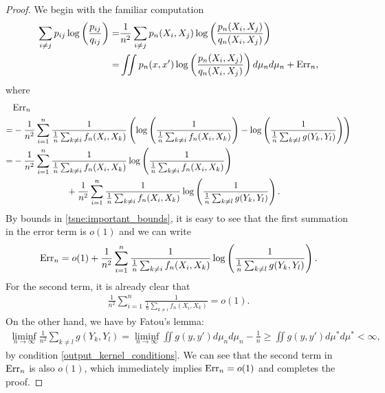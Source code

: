 \documentclass[10pt]{article}
\newenvironment{Proof of lemma}{\noindent{\bf Proof of Lemma}}{\hfill$\Box$\newline}
\newenvironment{Proof of claim}{\noindent{\bf Proof of claim}}{\hfill$\Box$\newline}
\newenvironment{Proof of theorem}{\noindent{\bf Proof of Theorem}}{\hfill\scriptsize{$\Box$}\newline}
\newenvironment{Proof of theorems}{\noindent{\bf Proof of Theorems}}{\hfill$\Box$\newline}
\newenvironment{Proof of proposition}{\noindent{\bf Proof of Proposition}}{\hfill$\Box$\newline}
\newenvironment{Proof of propositions}{\noindent{\bf Proof of Propositions}}{\hfill$\Box$\newline}
\newenvironment{Proof of exercise}{\noindent{\it Proof of Exercise:}}{\hfill$\Box$}
\numberwithin{equation}{section}
\begin{document}
\begin{proof}
    We begin with the familiar computation
    \begin{align}
        \sum_{i \neq j} p_{ij} \log \left(\frac{p_{ij}}{q_{ij}}\right) = & \frac{1}{n^2}\sum_{i \neq j}p_n(X_i,X_j) \log \left(\frac{p_n(X_i,X_j)}{q_n(X_i,X_j)}\right) \nonumber          \\
        =                                                                & \iint p_n(x,x') \log \left(\frac{p_n(X_i,X_j)}{q_n(X_i,X_j)}\right) d \mu_n d \mu_n + \text{\normalfont Err}_n,
    \end{align}
    where
    \begin{align}
          & \text{\normalfont Err}_n \nonumber                                                                                                                                                                                                   \\
        = & -\frac{1}{n^2}\sum_{i=1}^n\frac{1}{\frac{1}{n}\sum_{k \neq i}f_n(X_i,X_k)}\left(\log \left(\frac{1}{\frac{1}{n}\sum_{k \neq i}f_n(X_i,X_k)}\right)-\log \left(\frac{1}{\frac{1}{n}\sum_{k \neq l}g(Y_k,Y_l)}\right)\right) \nonumber \\
        = & -\frac{1}{n^2}\sum_{i=1}^n\frac{1}{\frac{1}{n}\sum_{k \neq i}f_n(X_i,X_k)}\log \left(\frac{1}{\frac{1}{n}\sum_{k \neq i}f_n(X_i,X_k)}\right) \nonumber                                                                               \\
          & \qquad \qquad \qquad + \frac{1}{n^2}\sum_{i=1}^n\frac{1}{\frac{1}{n}\sum_{k \neq i}f_n(X_i,X_k)}\log \left(\frac{1}{\frac{1}{n}\sum_{k \neq l}g(Y_k,Y_l)}\right).
    \end{align}
    By bounds in \eqref{tsne:important_bounds}, it is easy to see that the first summation in the error term is $o(1)$ and we can write
    \begin{align}
        \text{\normalfont Err}_n = o(1) + \frac{1}{n^2}\sum_{i=1}^n\frac{1}{\frac{1}{n}\sum_{k \neq i}f_n(X_i,X_k)}\log \left(\frac{1}{\frac{1}{n}\sum_{k \neq l}g(Y_k,Y_l)}\right).
    \end{align}
    For the second term, it is already clear that
    \begin{align}
        \frac{1}{n^2}\sum_{i=1}^n\frac{1}{\frac{1}{n}\sum_{k \neq i}f_n(X_i,X_k)} = o(1).
    \end{align}
    On the other hand, we have by Fatou's lemma:
    \begin{align}
        \liminf_{n \to \infty}\frac{1}{n^2} \sum_{k \neq l}g(Y_k,Y_l) = \liminf_{n \to \infty} \iint g(y,y') d\mu_n d\mu_n - \frac{1}{n} \geq \iint g(y,y') d\mu^* d\mu^* < \infty,
    \end{align}
    by condition \ref{output_kernel_conditions}. We can see that the second term in $\text{\normalfont Err}_n$ is also $o(1)$, which immediately implies $\text{\normalfont Err}_n = o(1)$ and completes the proof.
\end{proof}
\end{document}
